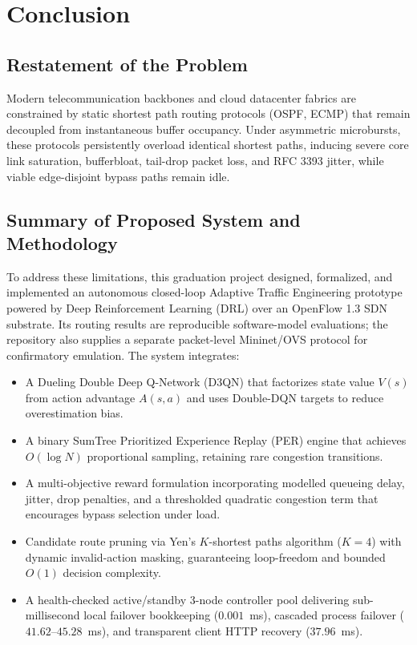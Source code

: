 \documentclass[12pt,a4paper,oneside]{report}
\begin{document}
\chapter{Conclusion}
\label{chap:conclusion}

\section{Restatement of the Problem}
Modern telecommunication backbones and cloud datacenter fabrics are constrained by static shortest path routing protocols (OSPF, ECMP) that remain decoupled from instantaneous buffer occupancy. Under asymmetric microbursts, these protocols persistently overload identical shortest paths, inducing severe core link saturation, bufferbloat, tail-drop packet loss, and RFC 3393 jitter, while viable edge-disjoint bypass paths remain idle.

\section{Summary of Proposed System and Methodology}
To address these limitations, this graduation project designed, formalized, and implemented an autonomous closed-loop Adaptive Traffic Engineering prototype powered by Deep Reinforcement Learning (DRL) over an OpenFlow 1.3 SDN substrate. Its routing results are reproducible software-model evaluations; the repository also supplies a separate packet-level Mininet/OVS protocol for confirmatory emulation. The system integrates:
\begin{itemize}
    \item A Dueling Double Deep Q-Network (D3QN) that factorizes state value $V(s)$ from action advantage $A(s, a)$ and uses Double-DQN targets to reduce overestimation bias.
    \item A binary SumTree Prioritized Experience Replay (PER) engine that achieves $O(\log N)$ proportional sampling, retaining rare congestion transitions.
    \item A multi-objective reward formulation incorporating modelled queueing delay, jitter, drop penalties, and a thresholded quadratic congestion term that encourages bypass selection under load.
    \item Candidate route pruning via Yen's $K$-shortest paths algorithm ($K=4$) with dynamic invalid-action masking, guaranteeing loop-freedom and bounded $O(1)$ decision complexity.
    \item A health-checked active/standby 3-node controller pool delivering sub-millisecond local failover bookkeeping ($0.001$~ms), cascaded process failover ($41.62$--$45.28$~ms), and transparent client HTTP recovery ($37.96$~ms).
\end{itemize}
\end{document}
